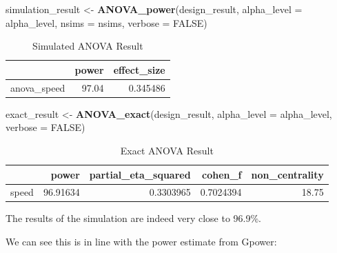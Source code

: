 \documentclass[
]{book}
\newenvironment{Shaded}{\begin{snugshade}}{\end{snugshade}}
\newcommand{\DataTypeTok}[1]{\textcolor[rgb]{0.13,0.29,0.53}{#1}}
\newcommand{\KeywordTok}[1]{\textcolor[rgb]{0.13,0.29,0.53}{\textbf{#1}}}
\newcommand{\NormalTok}[1]{#1}
\newcommand{\OtherTok}[1]{\textcolor[rgb]{0.56,0.35,0.01}{#1}}
\newcommand{\StringTok}[1]{\textcolor[rgb]{0.31,0.60,0.02}{#1}}
\begin{document}
\begin{Shaded}
\begin{Highlighting}[]
\NormalTok{simulation_result <-}\StringTok{ }\KeywordTok{ANOVA_power}\NormalTok{(design_result, }
                                 \DataTypeTok{alpha_level =}\NormalTok{ alpha_level, }
                                 \DataTypeTok{nsims =}\NormalTok{ nsims,}
                                 \DataTypeTok{verbose =} \OtherTok{FALSE}\NormalTok{)}
\end{Highlighting}
\end{Shaded}

\begin{table}[!h]

\caption{\label{tab:unnamed-chunk-82}Simulated ANOVA Result}
\centering
\begin{tabular}[t]{l|r|r}
\hline
  & power & effect\_size\\
\hline
anova\_speed & 97.04 & 0.345486\\
\hline
\end{tabular}
\end{table}

\begin{Shaded}
\begin{Highlighting}[]
\NormalTok{exact_result <-}\StringTok{ }\KeywordTok{ANOVA_exact}\NormalTok{(design_result,}
                            \DataTypeTok{alpha_level =}\NormalTok{ alpha_level,}
                            \DataTypeTok{verbose =} \OtherTok{FALSE}\NormalTok{)}
\end{Highlighting}
\end{Shaded}

\begin{table}[!h]

\caption{\label{tab:unnamed-chunk-84}Exact ANOVA Result}
\centering
\begin{tabular}[t]{l|r|r|r|r}
\hline
  & power & partial\_eta\_squared & cohen\_f & non\_centrality\\
\hline
speed & 96.91634 & 0.3303965 & 0.7024394 & 18.75\\
\hline
\end{tabular}
\end{table}

The results of the simulation are indeed very close to 96.9\%.
\newpage

We can see this is in line with the power estimate from Gpower:
\end{document}
